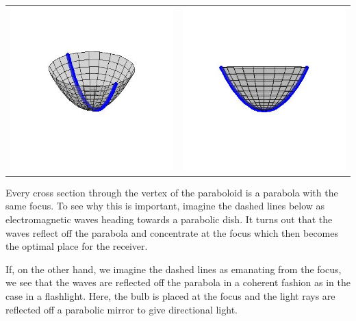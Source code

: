 \begin{center}

\begin{tabular}{cc}

\includegraphics[width=2.5in]{./ParabolasGraphics/Paraboloid01.jpg} & \includegraphics[width=2.5in]{./ParabolasGraphics/Paraboloid02.jpg} \\

\end{tabular}

\end{center}

Every cross section through the vertex of the paraboloid is a parabola with the same focus.  To see why this is important, imagine the dashed lines below as electromagnetic waves heading towards a parabolic dish.   It turns out that the waves reflect off the parabola and concentrate at the focus which then becomes the optimal place for the receiver. 

\smallskip

If, on the other hand, we imagine the dashed lines as emanating from the focus, we see that the waves are reflected off the parabola in a coherent fashion as in the case in a flashlight.  Here, the bulb is placed at the focus and the light rays are reflected off a parabolic mirror to give directional light.

